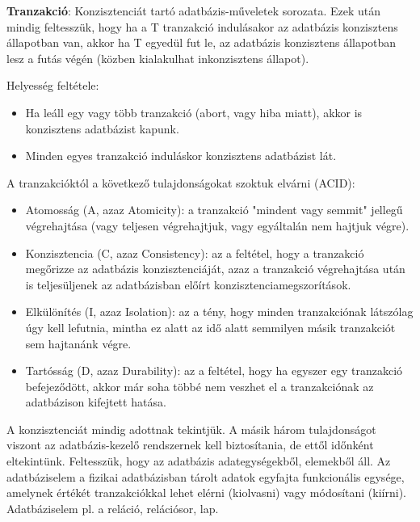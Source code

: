 \documentclass[margin=0px]{article}
\begin{document}
	\noindent \textbf{Tranzakció}: Konzisztenciát tartó adatbázis-műveletek sorozata. Ezek után mindig feltesszük, hogy ha
	a T tranzakció indulásakor az adatbázis konzisztens állapotban van, akkor ha T egyedül fut le, az adatbázis konzisztens állapotban
	lesz a futás végén (közben kialakulhat inkonzisztens állapot).
	
	\noindent Helyesség feltétele:
	\begin{itemize}
		\item	Ha leáll egy vagy több tranzakció (abort, vagy hiba miatt), akkor is konzisztens adatbázist kapunk.
		\item	Minden egyes tranzakció induláskor konzisztens adatbázist lát.
	\end{itemize} 
	
	\noindent A tranzakcióktól a következő tulajdonságokat szoktuk elvárni (ACID):
	
	\begin{itemize}
		\item	Atomosság (A, azaz Atomicity): a tranzakció "mindent vagy semmit" jellegű végrehajtása (vagy teljesen végrehajtjuk, vagy egyáltalán nem hajtjuk végre).
		
		\item	Konzisztencia (C, azaz Consistency): az a feltétel, hogy a tranzakció megőrizze az adatbázis konzisztenciáját, azaz a tranzakció végrehajtása után is teljesüljenek az adatbázisban előírt konzisztenciamegszorítások. 
		
		\item	Elkülönítés (I, azaz Isolation): az a tény, hogy minden tranzakciónak látszólag úgy kell lefutnia, mintha ez alatt az idő alatt semmilyen másik tranzakciót sem hajtanánk végre.
		
		\item	Tartósság (D, azaz Durability): az a feltétel, hogy ha egyszer egy tranzakció befejeződött, akkor már soha többé nem veszhet el a tranzakciónak az adatbázison kifejtett hatása.	
	\end{itemize}
	A konzisztenciát mindig adottnak tekintjük. A másik három tulajdonságot viszont az adatbázis-kezelő rendszernek kell biztosítania, de ettől időnként eltekintünk. Feltesszük, hogy az adatbázis adategységekből, elemekből áll. Az adatbáziselem a fizikai adatbázisban tárolt adatok egyfajta funkcionális egysége, amelynek értékét tranzakciókkal lehet elérni (kiolvasni) vagy módosítani (kiírni). Adatbáziselem
	pl. a reláció, relációsor, lap.\\
	
\end{document}
